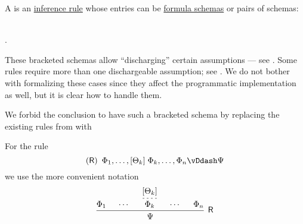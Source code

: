 \begin{definition}\label{def:natural_deduction_rule}\mimprovised
  A  is an \hyperref[def:inference_rule]{inference rule} whose entries can be \hyperref[con:schemas_and_instances]{formula schemas} or pairs of schemas:
  \begin{bnf*}
     { \bnfor} \\
    .
  \end{bnf*}

  These bracketed schemas allow \enquote{discharging} certain assumptions --- see . Some rules require more than one dischargeable assumption; see . We do not bother with formalizing these cases since they affect the programmatic implementation as well, but it is clear how to handle them.

  We forbid the conclusion to have such a bracketed schema by replacing the existing rules from  with
  \begin{bnf*}
     {}
  \end{bnf*}

  For the rule
  \begin{equation*}
    (\logic{R}) \enspace \Phi_1, \ldots, [\Theta_k] \thickspace \Phi_k, \ldots, \Phi_n \vDdash \Psi
  \end{equation*}
  we use the more convenient notation
  \begin{equation*}
    \begin{prooftree}
      \hypo{ \Phi_1 }
      \hypo{ \cdots }

      \hypo{ [\Theta_k] }
      \infer[dashed]1{ \Phi_k }

      \hypo{ \cdots }
      \hypo{ \Phi_n }
      \infer5[\logic{R}]{ \Psi }
    \end{prooftree}
  \end{equation*}
\end{definition}
